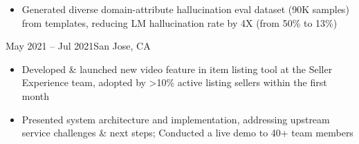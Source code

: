 \begin{itemize}


    \item Generated
    diverse
    domain-attribute
    hallucination 
    eval dataset (90K samples)
    from templates,
    reducing LM hallucination rate by 4X (from 50\% to 13\%)



\end{itemize}
\dividerSmall


    {}
    {May 2021 -- Jul 2021}{San Jose, CA}{}
\begin{itemize}

    \item Developed \& launched new video feature in item listing tool at the Seller Experience team,
    adopted by >10\% active listing sellers within the first month

    \item Presented system architecture and implementation, addressing upstream service challenges \& next steps;
    Conducted a live demo to 40+ team members \hspace{-0.5em}
\end{itemize}
\dividerSmall


